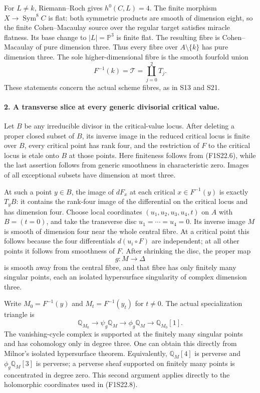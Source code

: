For $L\ne k$, Riemann--Roch gives $h^0(C,L)=4$.
The finite morphism $X\to\operatorname{Sym}^8 C$ is flat:
both symmetric products are smooth of dimension eight,
so the finite Cohen--Macaulay source over the regular
target satisfies miracle flatness. Its base change to
$|L|=\mathbb P^3$ is finite flat. The resulting fibre
is Cohen--Macaulay of pure dimension three. Thus every
fibre over $A\setminus\{k\}$ has pure dimension three.
The sole higher-dimensional fibre is the smooth fourfold union
\[
                         F^{-1}(k)=\mathcal T=\coprod_{j=0}^2T_j.
 \tag{F1S22.7}
\]
These statements concern the actual scheme fibres, as in S13
and S21.

\paragraph{2. A transverse slice at every generic divisorial critical value.}
Let $B$ be any irreducible divisor in the critical-value locus.
After deleting a proper closed subset of $B$, its inverse image
in the reduced critical locus is finite over $B$, every critical
point has rank four, and the restriction of $F$ to the critical
locus is etale onto $B$ at those points. Here finiteness follows
from (F1S22.6), while the last assertion follows from generic
smoothness in characteristic zero. Images of all exceptional
subsets have dimension at most three.

At such a point $y\in B$, the image of $dF_x$ at each critical
$x\in F^{-1}(y)$ is exactly $T_yB$: it contains the rank-four
image of the differential on the critical locus and has dimension
four. Choose local coordinates $(u_1,u_2,u_3,u_4,t)$ on $A$ with
$B=(t=0)$, and take the transverse disc $u_1=\cdots=u_4=0$.
Its inverse image $M$ is smooth of dimension four near the
whole central fibre. At a critical point this follows because
the four differentials $d(u_i\circ F)$ are independent; at
all other points it follows from smoothness of $F$.
After shrinking the disc, the proper map
\[
                    g:M\longrightarrow\Delta
 \tag{F1S22.8}
\]
is smooth away from the central fibre, and that fibre has only
finitely many singular points, each an isolated hypersurface
singularity of complex dimension three.

Write $M_0=F^{-1}(y)$ and $M_t=F^{-1}(y_t)$ for $t\ne0$.
The actual specialization triangle is
\[
 \mathbb Q_{M_0}\longrightarrow\psi_g\mathbb Q_M
 \longrightarrow\phi_g\mathbb Q_M\longrightarrow
 \mathbb Q_{M_0}[1].
 \tag{F1S22.9}
\]
The vanishing-cycle complex is supported at the finitely many singular
points and has cohomology only in degree three. One can obtain
this directly from Milnor's isolated hypersurface theorem.
Equivalently, $\mathbb Q_M[4]$ is perverse and
$\phi_g\mathbb Q_M[3]$ is perverse; a perverse sheaf supported
on finitely many points is concentrated in degree zero.
This second argument applies directly to the holomorphic
coordinates used in (F1S22.8).

